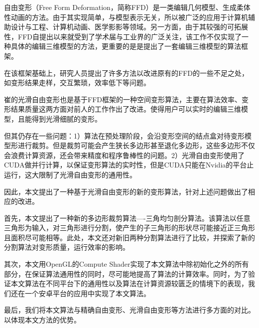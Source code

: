 
\begin{cabstract}
    自由变形\cite{Sederberg86}（Free Form Deformation，简称FFD）是一类编辑几何模型、生成柔体性动画的方法。由于其实现简单，与模型表示无关，所以被广泛的应用于计算机辅助设计与工程、计算机动画、医学影影等领域。另一方面，由于其较强的可拓展性，FFD\cite{Sederberg86}自提出以来就受到了学术届与工业界的广泛关注，该工作不仅实现了一种具体的编辑三维模型的方法，更重要的是是提出了一套编辑三维模型的算法框架。

在该框架基础上，研究人员提出了许多方法以改进原有的FFD的一些不足之处，如变形结果走样，交互繁琐，效率低下等问题。

    崔的光滑自由变形\cite{Cui15}也是基于FFD框架的一种空间变形算法，主要在算法效率、变形结果质量这两方面对前人的工作作出了改进。使得用户可以实时的编辑三维模型，且能得到光滑细腻的变形。

    但其仍存在一些问题：1）算法在预处理阶段，会沿变形空间的结点盒对待变形模型形进行裁剪。但是裁剪可能会产生狭长多边形甚至退化多边形，这些多边形不仅会浪费计算资源，还会带来精度和程序鲁棒性的问题。2）光滑自由变形使用了CUDA做并行计算，以保证变形算法的实时性，但是CUDA只能在Nvidia的平台止运行，这大限制了光滑自由变形的通用性。

    因此，本文提出了一种基于光滑自由变形的新的变形算法，针对上述问题做出了相应的改进。

    首先，本文提出了一种新的多边形裁剪算法----三角均匀剖分算法。该算法以任意三角形为输入，对三角形进行分割，使产生的子三角形的形状尽可能接近正三角形且面积尽可能相等。此处，本文还对新旧两种分割算法进行了比较，并探索了新的分割算法对变形质量，运行效率的影响。

    其次，本文用OpenGL的Compute Shader实现了本文算法中除初始化之外的所有部分，在保证算法通用性的同时，尽可能地提高了算法的计算效率。同时，为了验证本文算法在不同平台下的通用性以及算法在计算资源较匮乏的情境下的表现，我们还在一个安卓平台的应用中实现了本文算法。

    最后，我们将本文算法与精确自由变形、光滑自由变形等方法进行多方面的对比。以体现本文方法的优势。
\end{cabstract}

